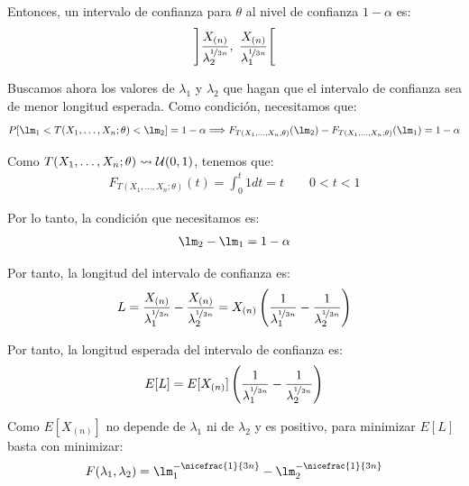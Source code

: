 \begin{ejercicio}
\begin{enumerate}
        Entonces, un intervalo de confianza para $\theta$ al nivel de confianza $1 - \alpha$ es:
        \begin{align*}
            \left]\dfrac{X_{(n)}}{\lambda_2^{\nicefrac{1}{3n}}},\  \dfrac{X_{(n)}}{\lambda_1^{\nicefrac{1}{3n}}}\right[
        \end{align*}

        Buscamos ahora los valores de $\lambda_1$ y $\lambda_2$ que hagan que el intervalo de confianza sea de menor longitud esperada. Como condición, necesitamos que:
        \begin{align*}
            P[\lm_1 < T(X_1, \ldots, X_n; \theta) < \lm_2] = 1 - \alpha\Longrightarrow F_{T(X_1, \ldots, X_n; \theta)}(\lm_2) - F_{T(X_1, \ldots, X_n; \theta)}(\lm_1) = 1 - \alpha
        \end{align*}

        Como $T(X_1, \ldots, X_n; \theta) \rightsquigarrow \mathcal{U}(0, 1)$, tenemos que:
        \begin{align*}
            F_{T(X_1, \ldots, X_n; \theta)}(t) = \int_{0}^{t} 1 dt = t\qquad 0 < t < 1
        \end{align*}

        Por lo tanto, la condición que necesitamos es:
        \begin{align*}
            \lm_2 - \lm_1 = 1 - \alpha
        \end{align*}

        Por tanto, la longitud del intervalo de confianza es:
        \begin{align*}
            L = \dfrac{X_{(n)}}{\lambda_1^{\nicefrac{1}{3n}}} - \dfrac{X_{(n)}}{\lambda_2^{\nicefrac{1}{3n}}} = X_{(n)}\left(\dfrac{1}{\lambda_1^{\nicefrac{1}{3n}}} - \dfrac{1}{\lambda_2^{\nicefrac{1}{3n}}}\right)
        \end{align*}

        Por tanto, la longitud esperada del intervalo de confianza es:
        \begin{align*}
            E[L] = E[X_{(n)}]\left(\dfrac{1}{\lambda_1^{\nicefrac{1}{3n}}} - \dfrac{1}{\lambda_2^{\nicefrac{1}{3n}}}\right)
        \end{align*}

        Como $E[X_{(n)}]$ no depende de $\lambda_1$ ni de $\lambda_2$ y es positivo, para minimizar $E[L]$ basta con minimizar:
        \begin{equation*}
            F(\lambda_1, \lambda_2) = \lm_1^{-\nicefrac{1}{3n}} - \lm_2^{-\nicefrac{1}{3n}}
        \end{equation*}


\end{enumerate}
\end{ejercicio}
